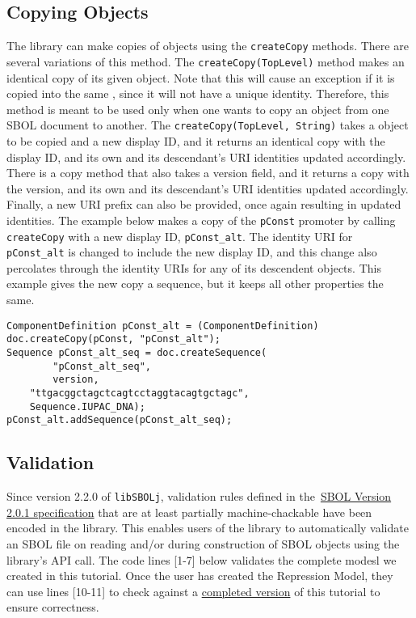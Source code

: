 \subsection*{Copying Objects}
The library can make copies of  objects using the \lstinline+createCopy+ methods.  There are several variations of this method. The \lstinline+createCopy(TopLevel)+ method makes an identical copy of its given  object. Note that this will cause an exception if it is copied into the same , since it will not have a unique identity. Therefore, this method is meant to be used only when one wants to copy an object from one SBOL document to another. The \lstinline+createCopy(TopLevel, String)+ takes a  object to be copied and a new display ID, and it returns an identical copy with the display ID, and its own and its descendant's URI identities updated accordingly. There is a copy method that also takes a version field, and it returns a copy with the version, and its own and its descendant's URI identities updated accordingly.  Finally, a new URI prefix can also be provided, once again resulting in updated identities. The example below makes a copy of the
\lstinline+pConst+ promoter by calling \lstinline+createCopy+ with a new display ID, \lstinline+pConst_alt+. The identity URI for \lstinline+pConst_alt+ is changed to include the new display ID, and this change also percolates through the identity URIs for any of its descendent objects.  This example gives the new copy a sequence, but it keeps all other properties the same. 

\vspace{\abovedisplayskip}
\begin{minipage}{0.95\textwidth} 
\begin{lstlisting}
ComponentDefinition pConst_alt = (ComponentDefinition) doc.createCopy(pConst, "pConst_alt");
Sequence pConst_alt_seq = doc.createSequence(
        "pConst_alt_seq", 
        version, 
	"ttgacggctagctcagtcctaggtacagtgctagc",
	Sequence.IUPAC_DNA); 
pConst_alt.addSequence(pConst_alt_seq);
\end{lstlisting}
\end{minipage}

\subsection*{Validation}
Since version 2.2.0 of {\tt libSBOLj}, validation rules defined in
the~\href{http://sbolstandard.org/downloads/specification-data-model-2-0/}{SBOL
  Version 2.0.1 specification} that are at least partially
machine-chackable have been encoded in the library. This enables users
of the library to automatically validate an SBOL file on reading
and/or during construction of SBOL objects using the library's API
call. The code lines [1-7] below validates the complete modesl we created in this
tutorial. Once the user has created the Repression Model, they can use lines [10-11] to check against a \href{https://github.com/SynBioDex/libSBOLj/blob/master/core2/src/test/resources/SBOL2/RepressionModel.rdf}{completed version} of this tutorial to ensure correctness. 

